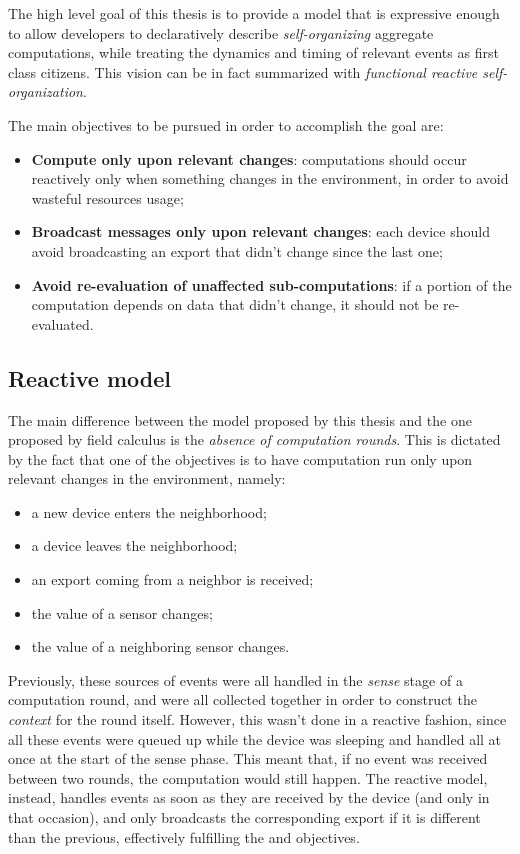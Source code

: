 The high level goal of this thesis is to provide a model that is expressive enough to allow developers to declaratively describe \textit{self-organizing} aggregate computations, while treating the dynamics and timing of relevant events as first class citizens.
%
This vision can be in fact summarized with \textit{functional reactive self-organization}.

The main objectives to be pursued in order to accomplish the goal are:
%
\begin{itemize}
    \item \textbf{Compute only upon relevant changes}: computations should occur reactively only when something changes in the environment, in order to avoid wasteful resources usage;
    \item \textbf{Broadcast messages only upon relevant changes}: each device should avoid broadcasting an export that didn't change since the last one;
    \item \textbf{Avoid re-evaluation of unaffected sub-computations}: if a portion of the computation depends on data that didn't change, it should not be re-evaluated.
\end{itemize}

\subsection{Reactive model}

The main difference between the model proposed by this thesis and the one proposed by field calculus is the \textit{absence of computation rounds}.
%
This is dictated by the fact that one of the objectives is to have computation run only upon relevant changes in the environment, namely:
%
\begin{itemize}
    \item a new device enters the neighborhood;
    \item a device leaves the neighborhood;
    \item an export coming from a neighbor is received;
    \item the value of a sensor changes;
    \item the value of a neighboring sensor changes.
\end{itemize}
%
Previously, these sources of events were all handled in the \textit{sense} stage of a computation round, and were all collected together in order to construct the \textit{context} for the round itself.
%
However, this wasn't done in a reactive fashion, since all these events were queued up while the device was sleeping and handled all at once at the start of the sense phase.
%
This meant that, if no event was received between two rounds, the computation would still happen.
%
The reactive model, instead, handles events as soon as they are received by the device (and only in that occasion), and only broadcasts the corresponding export if it is different than the previous, effectively fulfilling the  and  objectives.

